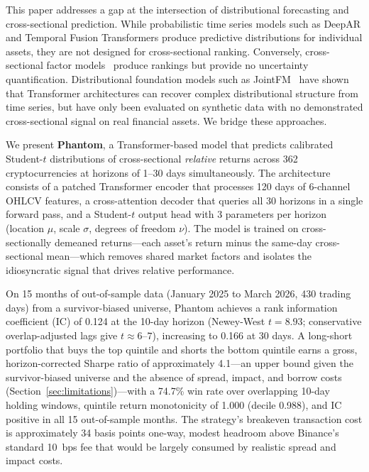 \documentclass[sigconf]{acmart}
\begin{document}
This paper addresses a gap at the intersection of distributional forecasting and cross-sectional prediction.
While probabilistic time series models such as DeepAR and Temporal Fusion Transformers produce predictive distributions for individual assets, they are not designed for cross-sectional ranking.
Conversely, cross-sectional factor models~\cite{liu2022,fieberg2024} produce rankings but provide no uncertainty quantification.
Distributional foundation models such as JointFM~\cite{hackmann2026} have shown that Transformer architectures can recover complex distributional structure from time series, but have only been evaluated on synthetic data with no demonstrated cross-sectional signal on real financial assets.
We bridge these approaches.

We present \textbf{Phantom}, a Transformer-based model that predicts calibrated Student-$t$ distributions of cross-sectional \emph{relative} returns across 362 cryptocurrencies at horizons of 1--30 days simultaneously.
The architecture consists of a patched Transformer encoder that processes 120 days of 6-channel OHLCV features, a cross-attention decoder that queries all 30 horizons in a single forward pass, and a Student-$t$ output head with 3 parameters per horizon (location $\mu$, scale $\sigma$, degrees of freedom $\nu$).
The model is trained on cross-sectionally demeaned returns---each asset's return minus the same-day cross-sectional mean---which removes shared market factors and isolates the idiosyncratic signal that drives relative performance.

On 15 months of out-of-sample data (January 2025 to March 2026, 430 trading days) from a survivor-biased universe, Phantom achieves a rank information coefficient (IC) of 0.124 at the 10-day horizon (Newey-West $t = 8.93$; conservative overlap-adjusted lags give $t \approx 6$--$7$), increasing to 0.166 at 30 days.
A long-short portfolio that buys the top quintile and shorts the bottom quintile earns a gross, horizon-corrected Sharpe ratio of approximately 4.1---an upper bound given the survivor-biased universe and the absence of spread, impact, and borrow costs (Section~\ref{sec:limitations})---with a 74.7\% win rate over overlapping 10-day holding windows, quintile return monotonicity of 1.000 (decile 0.988), and IC positive in all 15 out-of-sample months.
The strategy's breakeven transaction cost is approximately 34 basis points one-way, modest headroom above Binance's standard 10~bps fee that would be largely consumed by realistic spread and impact costs.
\end{document}
